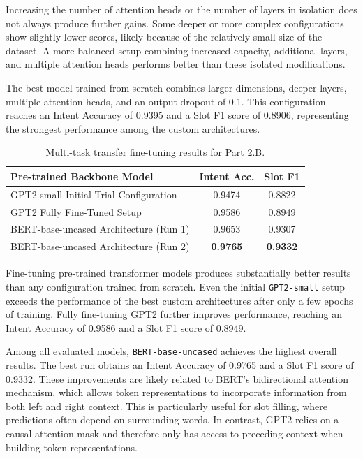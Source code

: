 Increasing the number of attention heads or the number of layers in isolation does not always produce further gains. Some deeper or more complex configurations show slightly lower scores, likely because of the relatively small size of the dataset. A more balanced setup combining increased capacity, additional layers, and multiple attention heads performs better than these isolated modifications.

The best model trained from scratch combines larger dimensions, deeper layers, multiple attention heads, and an output dropout of 0.1. This configuration reaches an Intent Accuracy of 0.9395 and a Slot F1 score of 0.8906, representing the strongest performance among the custom architectures.

\begin{table}[H]
\centering
\small
\caption{Multi-task transfer fine-tuning results for Part 2.B.}
\label{tab:2b_results}
\begin{tabular}{lcc}
\hline
\textbf{Pre-trained Backbone Model} & \textbf{Intent Acc.} & \textbf{Slot F1} \\ \hline
GPT2-small Initial Trial Configuration & 0.9474 & 0.8822 \\
GPT2 Fully Fine-Tuned Setup & 0.9586 & 0.8949 \\
BERT-base-uncased Architecture (Run 1) & 0.9653 & 0.9307 \\
BERT-base-uncased Architecture (Run 2) & \textbf{0.9765} & \textbf{0.9332} \\ \hline
\end{tabular}
\end{table}

Fine-tuning pre-trained transformer models produces substantially better results than any configuration trained from scratch. Even the initial \texttt{GPT2-small} setup exceeds the performance of the best custom architectures after only a few epochs of training. Fully fine-tuning GPT2 further improves performance, reaching an Intent Accuracy of 0.9586 and a Slot F1 score of 0.8949.

Among all evaluated models, \texttt{BERT-base-uncased} achieves the highest overall results. The best run obtains an Intent Accuracy of 0.9765 and a Slot F1 score of 0.9332. These improvements are likely related to BERT's bidirectional attention mechanism, which allows token representations to incorporate information from both left and right context. This is particularly useful for slot filling, where predictions often depend on surrounding words. In contrast, GPT2 relies on a causal attention mask and therefore only has access to preceding context when building token representations.

